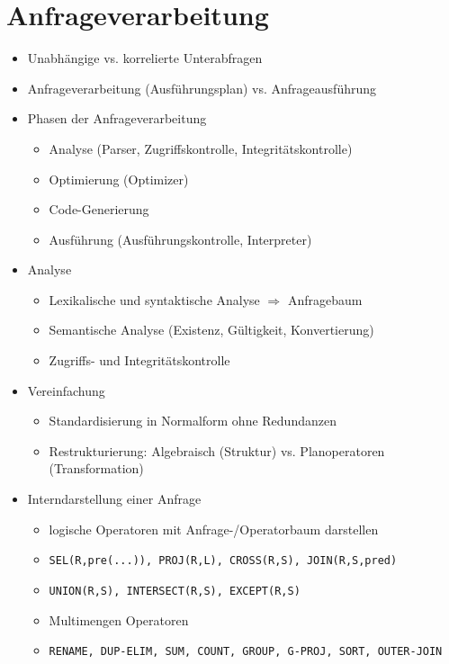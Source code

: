 \documentclass[11pt, paper=a4, twocolumn]{scrartcl}
\begin{document}
	\section{Anfrageverarbeitung}
		\begin{itemize}
			\item Unabhängige vs. korrelierte Unterabfragen
			\item Anfrageverarbeitung (Ausführungsplan) vs. Anfrageausführung
			\item Phasen der Anfrageverarbeitung
				\begin{itemize}
					\item Analyse (Parser, Zugriffskontrolle, 
						Integritätskontrolle)
					\item Optimierung (Optimizer)
					\item Code-Generierung
					\item Ausführung (Ausführungskontrolle, 
						Interpreter)
				\end{itemize}
			\item Analyse
				\begin{itemize}
					\item Lexikalische und syntaktische Analyse 
						$\Rightarrow$ Anfragebaum
					\item Semantische Analyse (Existenz, Gültigkeit, 
						Konvertierung)
					\item Zugriffs- und Integritätskontrolle
				\end{itemize}
			\item Vereinfachung
				\begin{itemize}
					\item Standardisierung in Normalform ohne 
						Redundanzen
					\item Restrukturierung: Algebraisch (Struktur) vs. 
						Planoperatoren (Transformation)
				\end{itemize}
			\item Interndarstellung einer Anfrage
				\begin{itemize}
					\item logische Operatoren mit 
						Anfrage-/Operatorbaum darstellen
					\item \texttt{SEL(R,pre(...)), PROJ(R,L), 
						CROSS(R,S), JOIN(R,S,pred)}
					\item \texttt{UNION(R,S), INTERSECT(R,S), 
						EXCEPT(R,S)} 
					\item Multimengen Operatoren
					\item \texttt{RENAME, DUP-ELIM, SUM, COUNT, GROUP, 
						G-PROJ, SORT, OUTER-JOIN}

\end{itemize}
\end{itemize}
\end{document}
